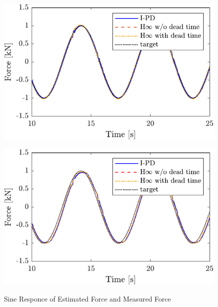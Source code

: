 \begin{figure}[t]
    \begin{minipage}{\minipageratio\hsize}
    \centering
        \includegraphics[keepaspectratio, scale = \minifigscale]{contents/ForceControl/figure/1115/crop-1115_diff_estforce_sin.pdf}
        \label{fig4:crop-1115_diff_estforce_sin}
    \end{minipage}
    \begin{minipage}{\minipageratio\hsize}
    \centering
        \includegraphics[keepaspectratio, scale = \minifigscale]{contents/ForceControl/figure/1115/crop-1115_diff_force_sin.pdf}
        \label{fig4:crop-1115_diff_force_sin}
    \end{minipage}
    \caption{Sine Responce of Estimated Force and Measured Force}
    \label{fig4:crop-1115_diff_sin}
\end{figure}


